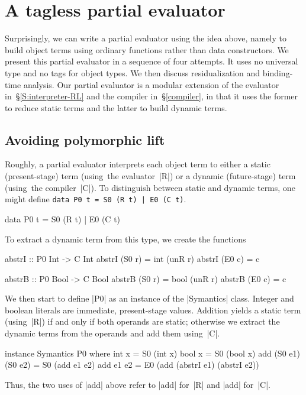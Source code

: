 \section{A tagless partial evaluator}\label{PE}

Surprisingly, we can write a partial evaluator using the idea above,
namely to build object terms using ordinary functions rather than data
constructors.  We present this partial evaluator in a sequence of four
attempts. It uses no universal type and no tags
for object types.  We then discuss residualization and binding-time
analysis.  Our partial evaluator is a modular extension of the evaluator
in~\S\ref{S:interpreter-RL} and the compiler in~\S\ref{compiler}, in
that it uses the former to reduce static terms and the latter to build
dynamic terms.

\subsection{Avoiding polymorphic lift}
\label{S:PE-lift}

Roughly, a partial evaluator interprets each object term to either
a static (present-stage) term (using\ifshort\else\ the evaluator\fi~|R|) or
a dynamic (future-stage) term (using\ifshort\else\ the compiler\fi~|C|).  To
distinguish between static and dynamic terms, one might define
\ifshort
\texttt{data P0~t~= S0~(R~t)~}\Verb+|+\texttt{ E0~(C~t)}.
\else
\begin{code}
data P0 t = S0 (R t) | E0 (C t)
\end{code}
To extract a dynamic term from this type, we create the functions
\begin{code}
abstrI :: P0 Int -> C Int
abstrI (S0 r) = int (unR r)
abstrI (E0 c) = c

abstrB :: P0 Bool -> C Bool
abstrB (S0 r) = bool (unR r)
abstrB (E0 c) = c
\end{code}
\fi
We then start to define |P0| as an instance of the |Symantics| class.
Integer and boolean literals are immediate, present-stage
values. Addition yields a static term (using~|R|) if and only if both operands
are static; otherwise we extract the dynamic terms from the operands and
add them using~|C|.
\ifshort\else
\begin{code}
instance Symantics P0 where
  int  x = S0 (int x)
  bool x = S0 (bool x)
  add (S0 e1) (S0 e2) = S0 (add e1 e2)
  add     e1      e2  = E0 (add (abstrI e1) (abstrI e2))
\end{code}
Thus, the two uses of |add| above refer to
|add| for~|R| and |add| for~|C|.

